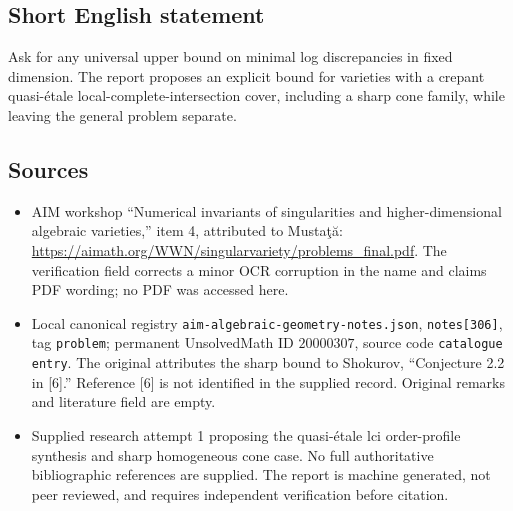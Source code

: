 \documentclass[11pt]{article}
\begin{document}
\subsection{Short English statement}
Ask for any universal upper bound on minimal log discrepancies in fixed dimension. The report proposes an explicit bound for varieties with a crepant quasi-\'etale local-complete-intersection cover, including a sharp cone family, while leaving the general problem separate.
\subsection{Sources}
\begin{itemize}
\item AIM workshop ``Numerical invariants of singularities and higher-dimensional algebraic varieties,'' item 4, attributed to Musta\c{t}\u{a}: \url{https://aimath.org/WWN/singularvariety/problems_final.pdf}. The verification field corrects a minor OCR corruption in the name and claims PDF wording; no PDF was accessed here.
\item Local canonical registry \texttt{aim-algebraic-geometry-notes.json}, \texttt{notes[306]}, tag \texttt{problem}; permanent UnsolvedMath ID \(20000307\), source code \texttt{catalogue entry}. The original attributes the sharp bound to Shokurov, ``Conjecture 2.2 in [6].'' Reference [6] is not identified in the supplied record. Original remarks and literature field are empty.
\item Supplied research attempt 1 proposing the quasi-\'etale lci order-profile synthesis and sharp homogeneous cone case. No full authoritative bibliographic references are supplied. The report is machine generated, not peer reviewed, and requires independent verification before citation.
\end{itemize}
\end{document}
